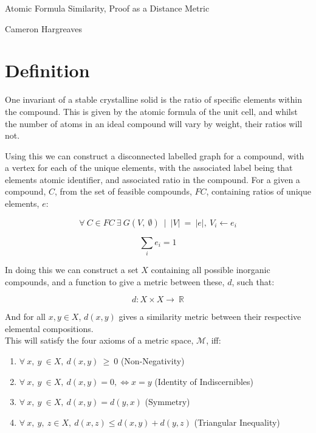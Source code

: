 \documentclass{article}
\begin{document}
\large %


{\Large %
\hfill  Atomic Formula Similarity, Proof as a Distance Metric}

\begin{center}
{\Large Cameron Hargreaves} %
\end{center}
\vspace{0.05in}

\section{Definition}
One invariant of a stable crystalline solid is the ratio of specific elements within the compound. This is given by the atomic formula of the unit cell, and whilst the number of atoms in an ideal compound will vary by weight, their ratios will not.

Using this we can construct a disconnected labelled graph for a compound, with a vertex for each of the unique elements, with the associated label being that elements atomic identifier, and associated ratio in the compound. For a given a compound, $C$, from the set of feasible compounds, $FC$, containing ratios of unique elements, $e$:

$$\forall\ C \in FC\ \exists\ G(V,\ \emptyset)\ \mid \ |V|\ =\ |e|,\ V_i \leftarrow e_i $$

$$\sum_{i} e_i = 1$$

In doing this we can construct a set $X$ containing all possible inorganic compounds, and a function to give a metric between these, $d$, such that:

$$d: X \times X \rightarrow\ \mathbb{R}$$

And for all $x, y \in X$, $d(x, y)$ gives a similarity metric between their respective elemental compositions. \\

This will satisfy the four axioms of a metric space, $\mathcal{M}$, iff:

\begin{enumerate}
   \item $\forall\ x,\ y\ \in X,\ d(x, y)\ \geq\ 0$  (Non-Negativity)
   \item $\forall\ x,\ y\ \in X,\ d(x, y) = 0, \Leftrightarrow x = y$ (Identity of Indiscernibles)
   \item $\forall\ x,\ y\ \in X,\ d(x, y) = d(y, x)$ (Symmetry)
   \item $\forall\ x,\ y,\ z \in X,\ d(x, z) \leq d(x, y) + d(y, z)$ (Triangular Inequality)
\end{enumerate}
\end{document}
